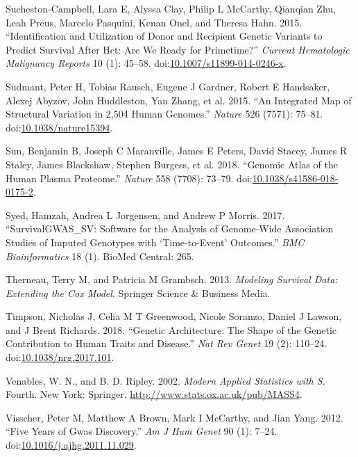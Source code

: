 \documentclass[]{DissertateOSU}
\begin{document}
\hypertarget{ref-lsc_2015}{}
Sucheston-Campbell, Lara E, Alyssa Clay, Philip L McCarthy, Qianqian
Zhu, Leah Preus, Marcelo Pasquini, Kenan Onel, and Theresa Hahn. 2015.
``Identification and Utilization of Donor and Recipient Genetic Variants
to Predict Survival After Hct: Are We Ready for Primetime?''
\emph{Current Hematologic Malignancy Reports} 10 (1): 45--58.
doi:\href{https://doi.org/10.1007/s11899-014-0246-x}{10.1007/s11899-014-0246-x}.

\hypertarget{ref-Sudmant_2015}{}
Sudmant, Peter H, Tobias Rausch, Eugene J Gardner, Robert E Handsaker,
Alexej Abyzov, John Huddleston, Yan Zhang, et al. 2015. ``An Integrated
Map of Structural Variation in 2,504 Human Genomes.'' \emph{Nature} 526
(7571): 75--81.
doi:\href{https://doi.org/10.1038/nature15394}{10.1038/nature15394}.

\hypertarget{ref-sun_2018}{}
Sun, Benjamin B, Joseph C Maranville, James E Peters, David Stacey,
James R Staley, James Blackshaw, Stephen Burgess, et al. 2018. ``Genomic
Atlas of the Human Plasma Proteome.'' \emph{Nature} 558 (7708): 73--79.
doi:\href{https://doi.org/10.1038/s41586-018-0175-2}{10.1038/s41586-018-0175-2}.

\hypertarget{ref-survivalgwas_sv}{}
Syed, Hamzah, Andrea L Jorgensen, and Andrew P Morris. 2017.
``SurvivalGWAS\_SV: Software for the Analysis of Genome-Wide Association
Studies of Imputed Genotypes with `Time-to-Event' Outcomes.'' \emph{BMC
Bioinformatics} 18 (1). BioMed Central: 265.

\hypertarget{ref-therneau2013}{}
Therneau, Terry M, and Patricia M Grambsch. 2013. \emph{Modeling
Survival Data: Extending the Cox Model}. Springer Science \& Business
Media.

\hypertarget{ref-Timpson_2018}{}
Timpson, Nicholas J, Celia M T Greenwood, Nicole Soranzo, Daniel J
Lawson, and J Brent Richards. 2018. ``Genetic Architecture: The Shape of
the Genetic Contribution to Human Traits and Disease.'' \emph{Nat Rev
Genet} 19 (2): 110--24.
doi:\href{https://doi.org/10.1038/nrg.2017.101}{10.1038/nrg.2017.101}.

\hypertarget{ref-Venables_2002}{}
Venables, W. N., and B. D. Ripley. 2002. \emph{Modern Applied Statistics
with S}. Fourth. New York: Springer.
\url{http://www.stats.ox.ac.uk/pub/MASS4}.

\hypertarget{ref-Visscher_2012}{}
Visscher, Peter M, Matthew A Brown, Mark I McCarthy, and Jian Yang.
2012. ``Five Years of Gwas Discovery.'' \emph{Am J Hum Genet} 90 (1):
7--24.
doi:\href{https://doi.org/10.1016/j.ajhg.2011.11.029}{10.1016/j.ajhg.2011.11.029}.
\end{document}
